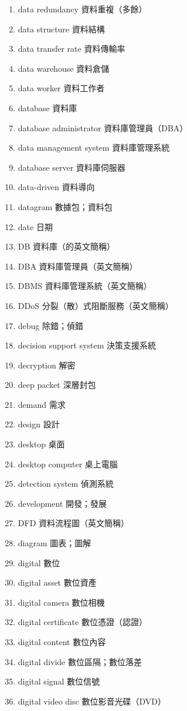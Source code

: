 \begin{enumerate}
  \item data redundancy 資料重複（多餘）
  \item data structure 資料結構
  \item data transfer rate 資料傳輸率
  \item data warehouse 資料倉儲
  \item data worker 資料工作者
  \item database 資料庫
  \item database administrator 資料庫管理員（DBA）
  \item data management system 資料庫管理系統
  \item database server 資料庫伺服器
  \item data-driven 資料導向
  \item datagram 數據包；資料包
  \item date 日期
  \item DB 資料庫（的英文簡稱）
  \item DBA 資料庫管理員（英文簡稱）
  \item DBMS 資料庫管理系統（英文簡稱）
  \item DDoS 分裂（散）式阻斷服務（英文簡稱）
  \item debug 除錯；偵錯
  \item decision support system 決策支援系統
  \item decryption 解密
  \item deep packet 深層封包
  \item demand 需求
  \item design 設計
  \item desktop 桌面
  \item desktop computer 桌上電腦
  \item detection system 偵測系統
  \item development 開發；發展
  \item DFD 資料流程圖（英文簡稱）
  \item diagram 圖表；圖解
  \item digital 數位
  \item digital asset 數位資產
  \item digital camera 數位相機
  \item digital certificate 數位憑證（認證）
  \item digital content 數位內容
  \item digital divide 數位區隔；數位落差
  \item digital signal 數位信號
  \item digital video disc 數位影音光碟（DVD）

\end{enumerate}
